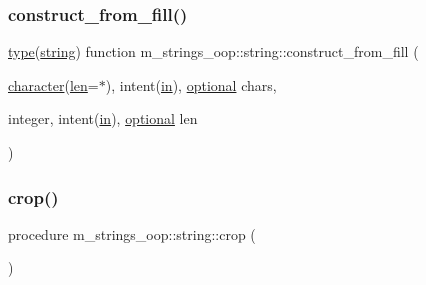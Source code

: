 \mbox{\label{structm__strings__oop_1_1string_ab205d416fbeaaec946c2b847683d640e}} 
\subsubsection{\texorpdfstring{construct\+\_\+from\+\_\+fill()}{construct\_from\_fill()}}
{\footnotesize\ttfamily \hyperlink{stop__watch_83_8txt_a70f0ead91c32e25323c03265aa302c1c}{type}(\hyperlink{structm__strings__oop_1_1string}{string}) function m\+\_\+strings\+\_\+oop\+::string\+::construct\+\_\+from\+\_\+fill (\begin{DoxyParamCaption}\item[{\hyperlink{option__stopwatch_83_8txt_abd4b21fbbd175834027b5224bfe97e66}{character}(\hyperlink{structm__strings__oop_1_1string_acd9093a5a0ca686837cce1908846ae53}{len}=$\ast$), intent(\hyperlink{M__journal_83_8txt_afce72651d1eed785a2132bee863b2f38}{in}), \hyperlink{option__stopwatch_83_8txt_aa4ece75e7acf58a4843f70fe18c3ade5}{optional}}]{chars,  }\item[{integer, intent(\hyperlink{M__journal_83_8txt_afce72651d1eed785a2132bee863b2f38}{in}), \hyperlink{option__stopwatch_83_8txt_aa4ece75e7acf58a4843f70fe18c3ade5}{optional}}]{len }\end{DoxyParamCaption})\hspace{0.3cm}{\ttfamily [private]}}

\mbox{\label{structm__strings__oop_1_1string_a56c652bda0c81f09810f81fceb220d14}} 
\subsubsection{\texorpdfstring{crop()}{crop()}}
{\footnotesize\ttfamily procedure m\+\_\+strings\+\_\+oop\+::string\+::crop (\begin{DoxyParamCaption}{ }\end{DoxyParamCaption})\hspace{0.3cm}{\ttfamily [private]}}

